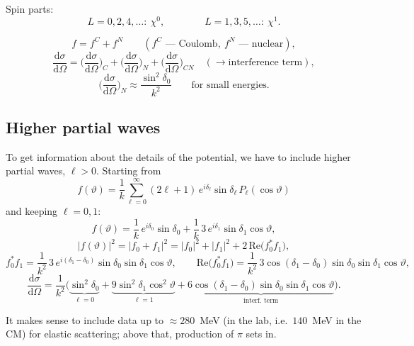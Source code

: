 \documentclass[11pt,a4paper]{article}
\newcommand{\ud}{\mathrm{d}}
\begin{document}
\begin{center}
\end{center}

Spin parts:
\[
L=0,2,4,\dots:\ \chi^0,\qquad\qquad L=1,3,5,\dots:\ \chi^1 .
\]

\[
f=f^C+f^N\qquad(f^C \text{ --- Coulomb},\ f^N \text{ --- nuclear}),
\]
\[
\frac{\ud\sigma}{\ud\Omega}=\Big(\frac{\ud\sigma}{\ud\Omega}\Big)_C
+\Big(\frac{\ud\sigma}{\ud\Omega}\Big)_N
+\Big(\frac{\ud\sigma}{\ud\Omega}\Big)_{CN}
\quad(\to \text{interference term}),
\]
\[
\Big(\frac{\ud\sigma}{\ud\Omega}\Big)_N\approx\frac{\sin^2\delta_0}{k^2}
\qquad\text{for small energies.}
\]

\subsection{Higher partial waves}

To get information about the details of the potential, we have to include
higher partial waves, $\ell>0$. Starting from
\[
f(\vartheta)=\frac1k\sum_{\ell=0}^{\infty}(2\ell+1)\,e^{i\delta_\ell}\sin\delta_\ell\,P_\ell(\cos\vartheta)
\]
and keeping $\ell=0,1$:
\[
f(\vartheta)=\frac1k\,e^{i\delta_0}\sin\delta_0+\frac1k\,3\,e^{i\delta_1}\sin\delta_1\cos\vartheta ,
\]
\[
|f(\vartheta)|^2=|f_0+f_1|^2=|f_0|^2+|f_1|^2+2\,\mathrm{Re}\big(f_0^*f_1\big),
\]
\[
f_0^*f_1=\frac{1}{k^2}\,3\,e^{i(\delta_1-\delta_0)}\sin\delta_0\sin\delta_1\cos\vartheta,
\qquad
\mathrm{Re}\big(f_0^*f_1\big)=\frac{1}{k^2}\,3\cos(\delta_1-\delta_0)\sin\delta_0\sin\delta_1\cos\vartheta,
\]
\[
\frac{\ud\sigma}{\ud\Omega}=\frac{1}{k^2}\Big(
\underbrace{\sin^2\delta_0}_{\ell=0}+\underbrace{9\sin^2\delta_1\cos^2\vartheta}_{\ell=1}
+\underbrace{6\cos(\delta_1-\delta_0)\sin\delta_0\sin\delta_1\cos\vartheta}_{\text{interf.\ term}}\Big).
\]

It makes sense to include data up to $\approx280$~MeV (in the lab, i.e.\
$140$~MeV in the CM) for elastic scattering; above that, production of $\pi$
sets in.
\end{document}
